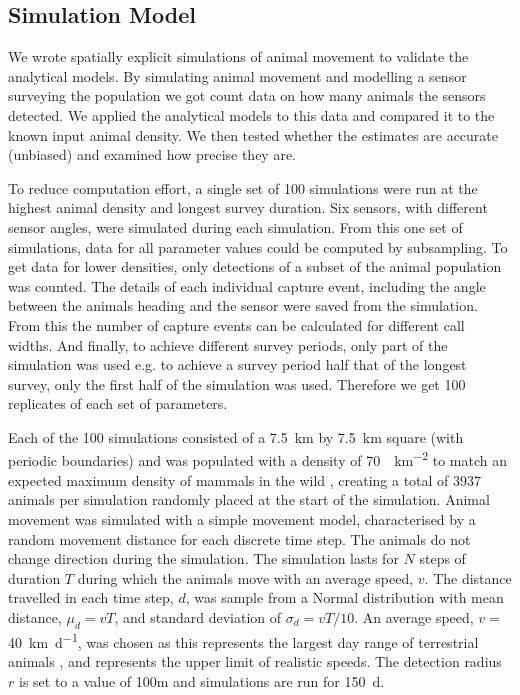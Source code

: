 \documentclass[a4paper,10pt,reqno,oneside]{amsart}
\begin{document}
\subsection{Simulation Model}

We wrote spatially explicit simulations of animal movement to validate the analytical models. By simulating animal movement and modelling a sensor surveying the population we got count data on how many animals the sensors detected. We applied the analytical models to this data and compared it to the known input animal density. We then tested whether the estimates are accurate (unbiased) and examined how precise they are.

To reduce computation effort, a single set of 100 simulations were run at the highest animal density and longest survey duration. Six sensors, with different sensor angles, were simulated during each simulation. From this one set of simulations, data for all parameter values could be computed by subsampling. To get data for lower densities, only detections of a subset of the animal population was counted. The details of each individual capture event, including the angle between the animals heading and the sensor were saved from the simulation.  From this the number of capture events can be calculated for different call widths. And finally, to achieve different survey periods, only part of the simulation was used e.g. to achieve a survey period half that of the longest survey, only the first half of the simulation was used. Therefore we get 100 replicates of each set of parameters.

Each of the 100 simulations consisted of a  \SI{7.5}{\kilo\meter} by \SI{7.5}{\kilo\meter} square (with periodic boundaries) and was populated with a density of \SI{70}{\animals\per\kilo\meter\squared} to match an expected maximum density of mammals in the wild \citep{damuth1981population}, creating a total of 3937 animals per simulation randomly placed at the start of the simulation. Animal movement was simulated with a simple movement model, characterised by a random movement distance for each discrete time step. The animals do not change direction during the simulation. The simulation lasts for $N$ steps of duration $T$ during which the animals move with an average speed, $v$. The distance travelled in each time step, $d$, was sample from a Normal distribution with mean distance, $\mu_d = vT$,  and standard deviation of $\sigma_d = vT/10$. An average speed, $v = $ \SI{40}{\kilo\meter \per \day}, was chosen as this represents the largest day range of terrestrial animals \citep{carbone2005far}, and represents the upper limit of realistic speeds. The detection radius $r$ is set to a value of 100m and simulations are run for \SI{150}{\day}.
\end{document}
